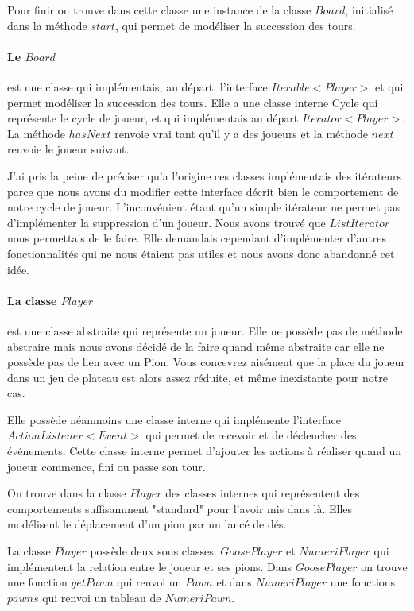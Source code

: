 \documentclass{article}
\begin{document}
Pour finir on trouve dans cette classe une instance de la classe $Board$, initialisé dans la méthode $start$, qui permet de modéliser la succession des tours.

\paragraph{Le $Board$} est une classe qui implémentais, au départ, l'interface $Iterable<Player>$ et qui permet modéliser la succession des tours. Elle a une classe interne Cycle qui représente le cycle de joueur, et qui implémentais au départ $Iterator<Player>$. La méthode $hasNext$ renvoie vrai tant qu'il y a des joueurs et la méthode $next$ renvoie le joueur suivant. 

J'ai pris la peine de préciser qu'a l'origine ces classes implémentais des itérateurs parce que nous avons du modifier cette interface décrit bien le comportement de notre cycle de joueur. L'inconvénient étant qu'un simple itérateur ne permet pas d'implémenter la suppression d'un joueur. Nous avons trouvé que $ListIterator$ nous permettais de le faire. Elle demandais cependant d'implémenter d'autres fonctionnalités qui ne nous étaient pas utiles et nous avons donc abandonné cet idée.

\paragraph{La classe $Player$} est une classe abstraite qui représente un joueur. Elle ne possède pas de méthode abstraire mais nous avons décidé de la faire quand même abstraite car elle ne possède pas de lien avec un Pion. Vous concevrez aisément que la place du joueur dans un jeu de plateau est alors assez réduite, et même inexistante pour notre cas. 

Elle possède néanmoins une classe interne qui implémente l'interface $ActionListener<Event>$ qui permet de recevoir et de déclencher des événements. Cette classe interne permet d'ajouter les actions à réaliser quand un joueur commence, fini ou passe son tour.

On trouve dans la classe $Player$ des classes internes qui représentent des comportements suffisamment "standard" pour l'avoir mis dans là. Elles modélisent le déplacement d'un pion par un lancé de dés.

La classe $Player$ possède deux sous classes: $GoosePlayer$ et $NumeriPlayer$ qui implémentent la relation entre le joueur et ses pions. Dans $GoosePlayer$ on trouve une fonction $getPawn$ qui renvoi un $Pawn$ et dans $NumeriPlayer$ une fonctions $pawns$ qui renvoi un tableau de $NumeriPawn$.
\end{document}
